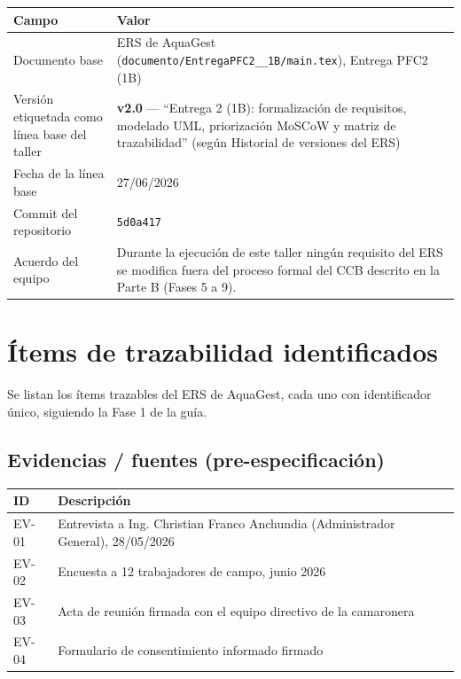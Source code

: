 \documentclass[11pt,a4paper]{article}
\begin{document}
\begin{longtable}{|p{4cm}|p{10.5cm}|}
\hline
\textbf{Campo} & \textbf{Valor} \\ \hline
\endhead
Documento base & ERS de AquaGest (\texttt{documento/EntregaPFC2\_\_1B/main.tex}), Entrega PFC2 (1B) \\ \hline
Versión etiquetada como línea base del taller & \textbf{v2.0} — ``Entrega 2 (1B): formalización de requisitos, modelado UML, priorización MoSCoW y matriz de trazabilidad'' (según Historial de versiones del ERS) \\ \hline
Fecha de la línea base & 27/06/2026 \\ \hline
Commit del repositorio & \texttt{5d0a417} \\ \hline
Acuerdo del equipo & Durante la ejecución de este taller ningún requisito del ERS se modifica fuera del proceso formal del CCB descrito en la Parte B (Fases 5 a 9). \\ \hline
\end{longtable}

\section{Ítems de trazabilidad identificados}

Se listan los ítems trazables del ERS de AquaGest, cada uno con identificador único, siguiendo la Fase 1 de la guía.

\subsection{Evidencias / fuentes (pre-especificación)}
\begin{longtable}{|p{2cm}|p{12.5cm}|}
\hline
\textbf{ID} & \textbf{Descripción} \\ \hline
\endhead
EV-01 & Entrevista a Ing. Christian Franco Anchundia (Administrador General), 28/05/2026 \\ \hline
EV-02 & Encuesta a 12 trabajadores de campo, junio 2026 \\ \hline
EV-03 & Acta de reunión firmada con el equipo directivo de la camaronera \\ \hline
EV-04 & Formulario de consentimiento informado firmado \\ \hline
\end{longtable}
\end{document}
